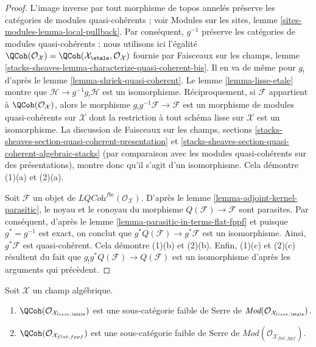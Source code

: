\begin{proof}
L'image inverse par tout morphisme de topos annelés préserve les catégories de
modules quasi-cohérents ; voir
Modules sur les sites, lemme \ref{sites-modules-lemma-local-pullback}.
Par conséquent, $g^{-1}$ préserve les catégories de modules quasi-cohérents ;
nous utilisons ici l'égalité
$\QCoh(\mathcal{O}_\mathcal{X}) =
\QCoh(\mathcal{X}_\etale, \mathcal{O}_\mathcal{X})$
fournie par Faisceaux sur les champs, lemme
\ref{stacks-sheaves-lemma-characterize-quasi-coherent-bis}.
Il en va de même pour $g_!$ d'après le
lemme \ref{lemma-shriek-quasi-coherent}.
Le lemme \ref{lemma-lisse-etale} montre que
$\mathcal{H} \to g^{-1}g_!\mathcal{H}$ est un isomorphisme.
Réciproquement, si $\mathcal{F}$ appartient à $\QCoh(\mathcal{O}_\mathcal{X})$,
alors le morphisme $g_!g^{-1}\mathcal{F} \to \mathcal{F}$ est un morphisme de
modules quasi-cohérents sur $\mathcal{X}$ dont la restriction à tout schéma lisse sur
$\mathcal{X}$ est un isomorphisme. La discussion de
Faisceaux sur les champs, sections
\ref{stacks-sheaves-section-quasi-coherent-presentation} et
\ref{stacks-sheaves-section-quasi-coherent-algebraic-stacks}
(par comparaison avec les modules quasi-cohérents sur des présentations),
montre donc qu'il s'agit d'un isomorphisme. Cela démontre (1)(a) et (2)(a).

\medskip\noindent
Soit $\mathcal{F}$ un objet de
$\textit{LQCoh}^{fbc}(\mathcal{O}_\mathcal{X})$. D'après le
lemme \ref{lemma-adjoint-kernel-parasitic},
le noyau et le conoyau du morphisme
$Q(\mathcal{F}) \to \mathcal{F}$ sont parasites. Par conséquent, d'après le
lemme \ref{lemma-parasitic-in-terms-flat-fppf}
et puisque $g^* = g^{-1}$ est exact, on conclut que
$g^*Q(\mathcal{F}) \to g^*\mathcal{F}$ est un isomorphisme. Ainsi,
$g^*\mathcal{F}$ est quasi-cohérent. Cela démontre (1)(b) et (2)(b).
Enfin, (1)(c) et (2)(c) résultent du fait que
$g_!g^*Q(\mathcal{F}) \to Q(\mathcal{F})$ est un isomorphisme d'après
les arguments qui précèdent.
\end{proof}

\begin{lemma}
\label{lemma-quasi-coherent-weak-serre}
Soit $\mathcal{X}$ un champ algébrique.
\begin{enumerate}
\item $\QCoh(\mathcal{O}_{\mathcal{X}_{lisse,\etale}})$
est une sous-catégorie faible de Serre de
$\textit{Mod}(\mathcal{O}_{\mathcal{X}_{lisse,\etale}})$.
\item $\QCoh(\mathcal{O}_{\mathcal{X}_{flat,fppf}})$
est une sous-catégorie faible de Serre de
$\textit{Mod}(\mathcal{O}_{\mathcal{X}_{flat,fppf}})$.
\end{enumerate}
\end{lemma}

